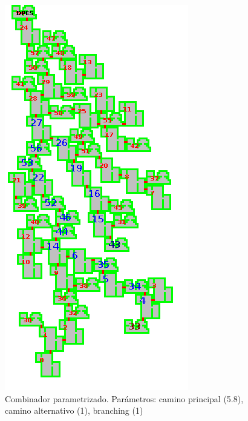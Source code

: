 \begin{figure}[H]
\centering
\includegraphics[scale=1]{img/mapsamples/MAINaltbranch}
\caption{Combinador parametrizado. Parámetros: camino principal (5.8), camino alternativo (1), branching (1)
\label{fig:grfmainaltbranch}}
\end{figure}



